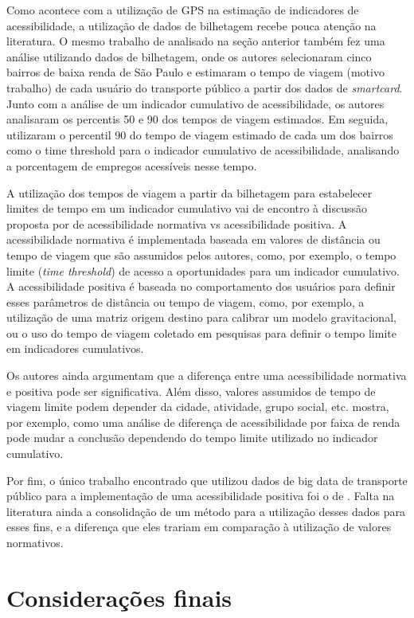 \documentclass[        
    a4paper,          %
    12pt,             %
    chapter=TITLE,    %
    section=Title,    %
    subsection=Title, %
    oneside,          %
    english,          %
    spanish,          %
    brazil,           %
    fleqn             %
]{abntex2}
\begin{document}
  Como acontece com a utilização de GPS na estimação de indicadores de acessibilidade, a utilização de dados de bilhetagem recebe pouca atenção na literatura. O mesmo trabalho de \citet{Arbex2016a} analisado na seção anterior também fez uma análise utilizando dados de bilhetagem, onde os autores selecionaram cinco bairros de baixa renda de São Paulo e estimaram o tempo de viagem (motivo trabalho) de cada usuário do transporte público a partir dos dados de \emph{smartcard}. Junto com a análise de um indicador cumulativo de acessibilidade, os autores analisaram os percentis 50 e 90 dos tempos de viagem estimados. Em seguida, utilizaram o percentil 90 do tempo de viagem estimado de cada um dos bairros como o time threshold para o indicador cumulativo de acessibilidade, analisando a porcentagem de empregos acessíveis nesse tempo.
  
  A utilização dos tempos de viagem a partir da bilhetagem para estabelecer limites de tempo em um indicador cumulativo vai de encontro à discussão proposta por \citet{Paez2012} de acessibilidade normativa vs acessibilidade positiva. A acessibilidade normativa é implementada baseada em valores de distância ou tempo de viagem que são assumidos pelos autores, como, por exemplo, o tempo limite (\emph{time threshold}) de acesso a oportunidades para um indicador cumulativo. A acessibilidade positiva é baseada no comportamento dos usuários para definir esses parâmetros de distância ou tempo de viagem, como, por exemplo, a utilização de uma matriz origem destino para calibrar um modelo gravitacional, ou o uso do tempo de viagem coletado em pesquisas para definir o tempo limite em indicadores cumulativos.
  
  Os autores ainda argumentam que a diferença entre uma acessibilidade normativa e positiva pode ser significativa. Além disso, valores assumidos de tempo de viagem limite podem depender da cidade, atividade, grupo social, etc. \citet{Pereira2019} mostra, por exemplo, como uma análise de diferença de acessibilidade por faixa de renda pode mudar a conclusão dependendo do tempo limite utilizado no indicador cumulativo.
  
  Por fim, o único trabalho encontrado que utilizou dados de big data de transporte público para a implementação de uma acessibilidade positiva foi o de \citet{Arbex2016a}. Falta na literatura ainda a consolidação de um método para a utilização desses dados para esses fins, e a diferença que eles trariam em comparação à utilização de valores normativos.
  
  \hypertarget{consideracoes-finais}{%
  \section{Considerações finais}\label{consideracoes-finais}}
  
\end{document}
